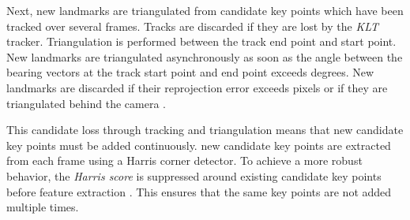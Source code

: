 Next, new landmarks are triangulated from candidate key points which have been tracked over several frames. 
Tracks are discarded if they are lost by the \emph{KLT} tracker.
Triangulation is performed between the track end point and start point. 
New landmarks are triangulated asynchronously as soon as the angle between the bearing vectors at the track start point and end point exceeds \triangulationAngleThreshold degrees. 
New landmarks are discarded if their reprojection error exceeds \triangulationMaxReprError pixels or if they are triangulated behind the camera . \par 
This candidate loss through tracking and triangulation means that new candidate key points must be added continuously. 
\addCandidateEachFrame new candidate key points are extracted from each frame using a Harris corner detector. 
To achieve a more robust behavior, the \emph{Harris score} is suppressed around existing candidate key points before feature extraction . This ensures that the same key points are not added multiple times.